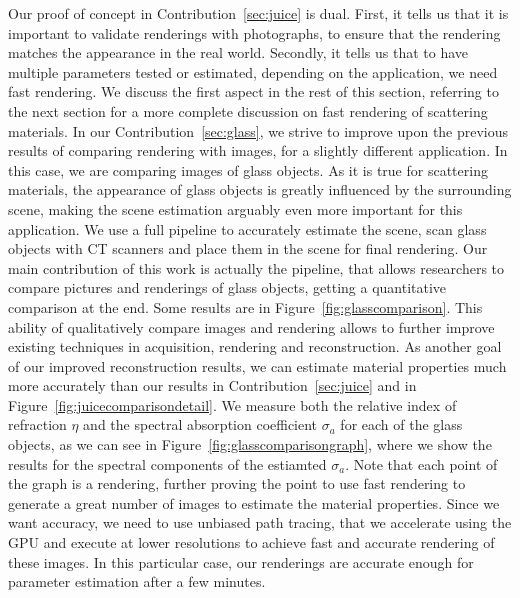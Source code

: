 Our proof of concept in Contribution~\ref{sec:juice} is dual. First, it tells us that it is important to validate renderings with photographs, to ensure that the rendering matches the appearance in the real world. Secondly, it tells us that to have multiple parameters tested or estimated, depending on the application, we need fast rendering. We discuss the first aspect in the rest of this section, referring to the next section for a more complete discussion on fast rendering of scattering materials. In our Contribution~\ref{sec:glass}, we strive to improve upon the previous results of comparing rendering with images, for a slightly different application. In this case, we are comparing images of glass objects. As it is true for scattering materials, the appearance of glass objects is greatly influenced by the surrounding scene, making the scene estimation arguably even more important for this application. We use a full pipeline to accurately estimate the scene, scan glass objects with CT scanners and place them in the scene for final rendering. Our main contribution of this work is actually the pipeline, that allows researchers to compare pictures and renderings of glass objects, getting a quantitative comparison at the end. Some results are in Figure~\ref{fig:glasscomparison}. This ability of qualitatively compare images and rendering allows to further improve existing techniques in acquisition, rendering and reconstruction. As another goal of our improved reconstruction results, we can estimate material properties much more accurately than our  results in Contribution~\ref{sec:juice} and in Figure~\ref{fig:juicecomparisondetail}. We measure both the relative index of refraction $\eta$ and the spectral absorption coefficient $\sigma_a$ for each of the glass objects, as we can see in Figure~\ref{fig:glasscomparisongraph}, where we show the results for the spectral components of the estiamted $\sigma_a$. Note that each point of the graph is a rendering, further proving the point to use fast rendering to generate a great number of images to estimate the material properties. Since we want accuracy, we need to use unbiased path tracing, that we accelerate using the GPU and execute at lower resolutions to achieve fast and accurate rendering of these images. In this particular case, our renderings are accurate enough for parameter estimation after a few minutes. 

